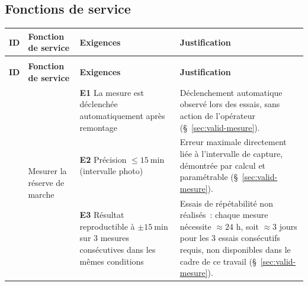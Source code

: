 \begin{landscape}
\subsection{Fonctions de service}

\label{tab:synthese-fs}
\begin{longtable}{|>{\raggedright\arraybackslash}p{1cm}|p{4cm}|p{8cm}|p{8cm}|}
\hline
\textbf{ID} & \textbf{Fonction de service} & \textbf{Exigences} & \textbf{Justification} \\
\hline
\endfirsthead

\multicolumn{4}{c}{\tablename\ \thetable{} (suite)} \\
\hline
\textbf{ID} & \textbf{Fonction de service} & \textbf{Exigences} & \textbf{Justification} \\
\hline
\endhead

\hline
\endfoot

\multirow{3}{*}{FS1} & \multirow{3}{4cm}{Mesurer la réserve de marche}
    & \cellcolor{resConforme}\rule[-0.4\baselineskip]{0pt}{1.8\baselineskip}\textbf{E1} La mesure est déclenchée automatiquement après remontage
    & \rule[-0.4\baselineskip]{0pt}{1.8\baselineskip}Déclenchement automatique observé lors des essais, sans action de l'opérateur (§~\ref{sec:valid-mesure}). \\
\cline{3-4}
 & & \cellcolor{resConforme}\rule[-0.4\baselineskip]{0pt}{1.8\baselineskip}\textbf{E2} Précision $\leq 15\ \mathrm{min}$ (intervalle photo)
    & \rule[-0.4\baselineskip]{0pt}{1.8\baselineskip}Erreur maximale directement liée à l'intervalle de capture, démontrée par calcul et paramétrable (§~\ref{sec:valid-mesure}). \\
\cline{3-4}
 & & \cellcolor{resNonVerifie}\rule[-0.4\baselineskip]{0pt}{1.8\baselineskip}\textbf{E3} Résultat reproductible à $\pm 15\ \mathrm{min}$ sur 3 mesures consécutives dans les mêmes conditions
    & \rule[-0.4\baselineskip]{0pt}{1.8\baselineskip}Essais de répétabilité non réalisés~: chaque mesure nécessite $\approx 24$ h, soit $\approx 3$ jours pour les 3 essais consécutifs requis, non disponibles dans le cadre de ce travail (§~\ref{sec:valid-mesure}). \\
\hline


\end{longtable}
\end{landscape}
